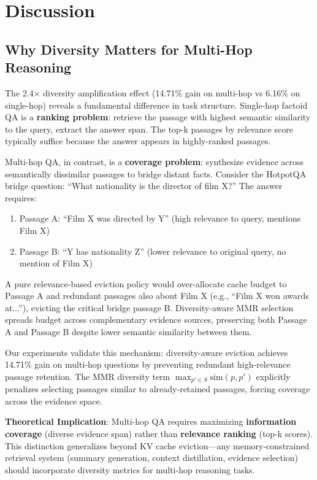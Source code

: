 \section{Discussion}

\subsection{Why Diversity Matters for Multi-Hop Reasoning}

The 2.4$\times$ diversity amplification effect (14.71\% gain on multi-hop vs 6.16\% on single-hop) reveals a fundamental difference in task structure. Single-hop factoid QA is a \textbf{ranking problem}: retrieve the passage with highest semantic similarity to the query, extract the answer span. The top-k passages by relevance score typically suffice because the answer appears in highly-ranked passages.

Multi-hop QA, in contrast, is a \textbf{coverage problem}: synthesize evidence across semantically dissimilar passages to bridge distant facts. Consider the HotpotQA bridge question: ``What nationality is the director of film X?'' The answer requires:
\begin{enumerate}
\item Passage A: ``Film X was directed by Y'' (high relevance to query, mentions Film X)
\item Passage B: ``Y has nationality Z'' (lower relevance to original query, no mention of Film X)
\end{enumerate}

A pure relevance-based eviction policy would over-allocate cache budget to Passage A and redundant passages also about Film X (e.g., ``Film X won awards at...''), evicting the critical bridge passage B. Diversity-aware MMR selection spreads budget across complementary evidence sources, preserving both Passage A and Passage B despite lower semantic similarity between them.

Our experiments validate this mechanism: diversity-aware eviction achieves 14.71\% gain on multi-hop questions by preventing redundant high-relevance passage retention. The MMR diversity term $\max_{p' \in S} \text{sim}(p, p')$ explicitly penalizes selecting passages similar to already-retained passages, forcing coverage across the evidence space.

\textbf{Theoretical Implication}: Multi-hop QA requires maximizing \textbf{information coverage} (diverse evidence span) rather than \textbf{relevance ranking} (top-k scores). This distinction generalizes beyond KV cache eviction—any memory-constrained retrieval system (summary generation, context distillation, evidence selection) should incorporate diversity metrics for multi-hop reasoning tasks.


